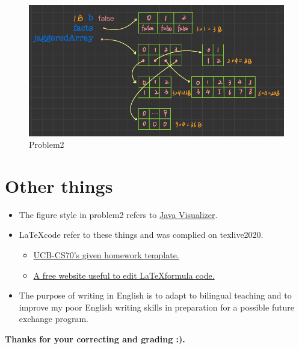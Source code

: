 \documentclass[11pt]{article}  %
\begin{document}
\begin{figure}[H]
    \centering
    \includegraphics{1/Draft_裁剪页面.pdf}
    \caption{Problem2}
\end{figure}


\section*{Other things}

\begin{itemize}
    \item The figure style in problem2 refers to \href{https://cscircles.cemc.uwaterloo.ca/java_visualize/#}{Java Visualizer}.
    \item \LaTeX \space code refer to these things and was complied on texlive2020.
    \begin{itemize}
        \item  \href{https://www.eecs70.org/assets/misc/homework_template.tex}{UCB-CS70's given homework template.} 
        \item  \href{https://www.latexlive.com}{A free website useful to edit \LaTeX \space formula code.}
    \end{itemize}
    \item The purpose of writing in English is to adapt to bilingual teaching and to improve my poor English 
        writing skills in preparation for a possible future exchange program. 
\end{itemize}

\textbf{Thanks for your correcting and grading :).}
\end{document}
